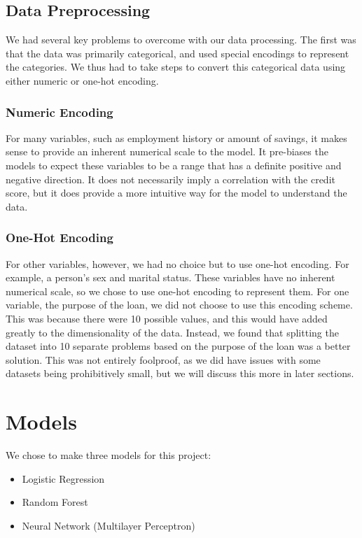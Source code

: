 \documentclass[12pt,twocolumn]{article}
\begin{document}
\subsection{Data Preprocessing}
We had several key problems to overcome with our data processing. The first was that the data was primarily categorical, and used special encodings to represent the categories. We thus had to take steps to convert this categorical data using either numeric or one-hot encoding. 

\subsubsection{Numeric Encoding}
For many variables, such as employment history or amount of savings, it makes sense to provide an inherent numerical scale to the model. It pre-biases the models to expect these variables to be a range that has a definite positive and negative direction. It does not necessarily imply a correlation with the credit score, but it does provide a more intuitive way for the model to understand the data.

\subsubsection{One-Hot Encoding}
For other variables, however, we had no choice but to use one-hot encoding. For example, a person's sex and marital status. These variables have no inherent numerical scale, so we chose to use one-hot encoding to represent them. For one variable, the purpose of the loan, we did not choose to use this encoding scheme. This was because there were 10 possible values, and this would have added greatly to the dimensionality of the data. Instead, we found that splitting the dataset into 10 separate problems based on the purpose of the loan was a better solution. This was not entirely foolproof, as we did have issues with some datasets being prohibitively small, but we will discuss this more in later sections.

\section{Models}
We chose to make three models for this project:
\begin{itemize}
    \item Logistic Regression
    \item Random Forest
    \item Neural Network (Multilayer Perceptron)
\end{itemize}
\end{document}
